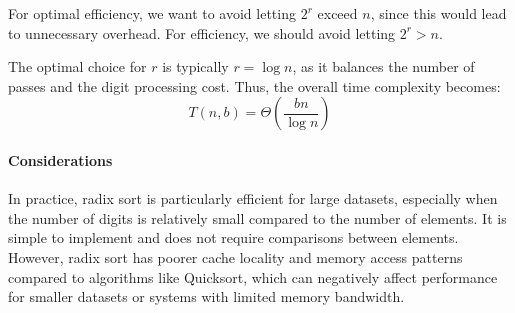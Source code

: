 For optimal efficiency, we want to avoid letting $2^r$ exceed $n$, since this would lead to unnecessary overhead.
For efficiency, we should avoid letting $2^r>n$.

The optimal choice for $r$ is typically $r=\log n$, as it balances the number of passes and the digit processing cost.
Thus, the overall time complexity becomes:
\[T(n,b)=\Theta\left(\dfrac{bn}{\log n}\right)\]

\paragraph*{Considerations}
In practice, radix sort is particularly efficient for large datasets, especially when the number of digits is relatively small compared to the number of elements. 
It is simple to implement and does not require comparisons between elements. 
However, radix sort has poorer cache locality and memory access patterns compared to algorithms like Quicksort, which can negatively affect performance for smaller datasets or systems with limited memory bandwidth.